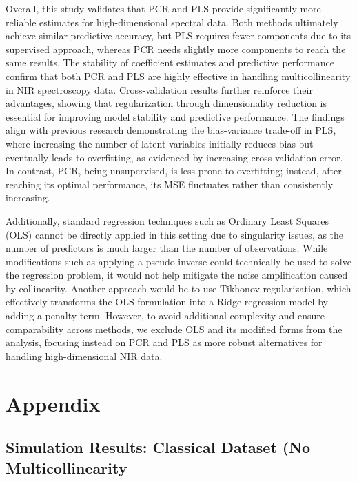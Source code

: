 \documentclass[11pt,twoside,a4paper]{article}
\begin{document}
Overall, this study validates that PCR and PLS provide significantly more reliable estimates for high-dimensional spectral data. Both methods ultimately achieve similar predictive accuracy, but PLS requires fewer components due to its supervised approach, whereas PCR needs slightly more components to reach the same results. The stability of coefficient estimates and predictive performance confirm that both PCR and PLS are highly effective in handling multicollinearity in NIR spectroscopy data. Cross-validation results further reinforce their advantages, showing that regularization through dimensionality reduction is essential for improving model stability and predictive performance. The findings align with previous research demonstrating the bias-variance trade-off in PLS, where increasing the number of latent variables initially reduces bias but eventually leads to overfitting, as evidenced by increasing cross-validation error. In contrast, PCR, being unsupervised, is less prone to overfitting; instead, after reaching its optimal performance, its MSE fluctuates rather than consistently increasing.

Additionally, standard regression techniques such as Ordinary Least Squares (OLS) cannot be directly applied in this setting due to singularity issues, as the number of predictors is much larger than the number of observations. While modifications such as applying a pseudo-inverse could technically be used to solve the regression problem, it would not help mitigate the noise amplification caused by collinearity. Another approach would be to use Tikhonov regularization, which effectively transforms the OLS formulation into a Ridge regression model by adding a penalty term. However, to avoid additional complexity and ensure comparability across methods, we exclude OLS and its modified forms from the analysis, focusing instead on PCR and PLS as more robust alternatives for handling high-dimensional NIR data.
\newpage

\section{Appendix}
\subsection{Simulation Results: Classical Dataset (No Multicollinearity}
\end{document}
